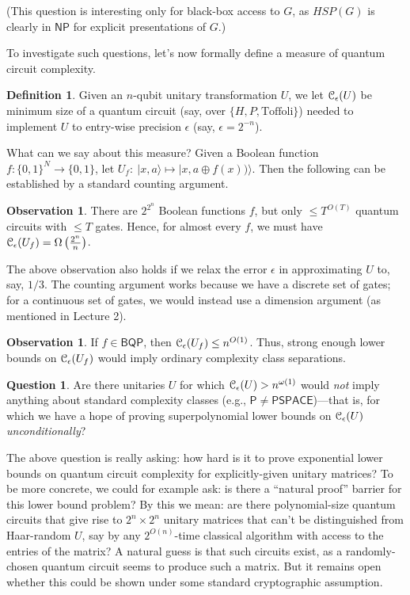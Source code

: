 \documentclass[11pt]{report}
\theoremstyle{plain}
\theoremstyle{definition}
\newtheorem{definition}[theorem]{Definition}
\newtheorem{question}[theorem]{Question}
\newtheorem{observation}[theorem]{Observation}
\renewcommand{\ket}[1]{|#1\rangle}
\begin{document}
(This question is interesting only for black-box access to $G$, as $HSP(G)$ is clearly in $\mathsf{NP}$ for explicit presentations of $G$.)

To investigate such questions, let's now formally define a measure of quantum circuit complexity.

\begin{definition}
Given an $n$-qubit unitary transformation $U$, we let ${\cal C}_{\epsilon}(U)$ be minimum size of a quantum circuit (say, over $\{H,P,\mbox{Toffoli}\}$) needed to implement $U$ to entry-wise precision $\epsilon$ (say, $\epsilon=2^{-n}$).
\end{definition}

What can we say about this measure?  Given a Boolean function $f:\{0,1\}^N\to\{0,1\}$, let $U_f:\ \ket{x,a}\mapsto \ket{x,a\oplus f(x))}$.  Then the following can be established by a standard counting argument.

\begin{observation}
There are $2^{2^n}$ Boolean functions $f$, but only $\leq T^{O(T)}$ quantum circuits with $\leq T$ gates.  Hence, for almost every $f$,
we must have ${\cal C}_{\epsilon}(U_f) = \Omega\left(\frac{2^n}n\right)$.
\end{observation}

The above observation also holds if we relax the error $\epsilon$ in approximating $U$ to, say, $1/3$. The counting argument works because we have a discrete set of gates; for a continuous set of gates, we would instead use a dimension argument (as mentioned in Lecture 2).

\begin{observation}
If $f\in \mathsf{BQP}$, then ${\cal C}_{\epsilon}(U_f)\leq n^{O(1)}$. Thus, strong enough lower bounds on ${\cal C}_{\epsilon}(U_f)$ would imply ordinary complexity
class separations.
\end{observation}

\begin{question}
Are there unitaries $U$ for which ${\cal C}_{\epsilon}(U) > n^{\omega(1)}$ would {\em not} imply anything about standard complexity classes (e.g., $\mathsf{P} \neq \mathsf{PSPACE}$)---that is, for which we have a hope of proving superpolynomial lower bounds on ${\cal C}_{\epsilon}(U)$ {\em unconditionally}?
\end{question}

The above question is really asking: how hard is it to prove exponential lower bounds on quantum circuit complexity for explicitly-given unitary matrices?  To be more concrete, we could for example ask: is there a ``natural proof'' barrier \cite{rr} for this lower bound problem?  By this we mean: are there polynomial-size quantum circuits that give rise to $2^n \times 2^n$ unitary matrices
that can't be distinguished from Haar-random $U$, say by any $2^{O(n)}$-time classical algorithm with access to the entries of the matrix?  A natural guess is that such circuits exist, as a randomly-chosen quantum circuit seems to produce such a matrix. But it remains open whether this could be shown under some standard cryptographic assumption.
\end{document}
